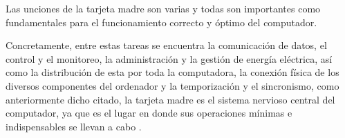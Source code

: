 Las unciones de la tarjeta madre son varias y todas son importantes como fundamentales para el funcionamiento correcto y óptimo del computador.

Concretamente, entre estas tareas se encuentra la comunicación de datos, el control y el monitoreo, la administración y la gestión de energía eléctrica, así como la distribución de esta por toda la computadora, la conexión física de los diversos componentes del ordenador y la temporización y el sincronismo, como anteriormente dicho citado, la tarjeta madre es el sistema nervioso central del computador, ya que es el lugar en donde sus operaciones mínimas e indispensables se llevan a cabo \cite{hptarjetamadre}.
